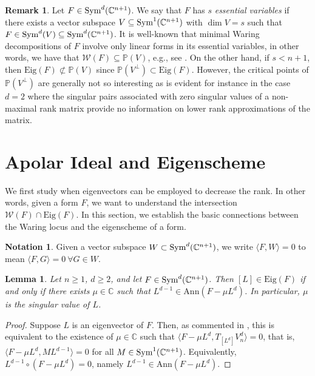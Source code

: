 \documentclass{amsart}
\numberwithin{theorem}{section}
\newtheorem{lemma}[theorem]{Lemma}
\theoremstyle{definition}
\newtheorem{remark}[theorem]{Remark}
\newtheorem{notation}[theorem]{Notation}
\newcommand{\Eig}{\mathrm{Eig}}
\newcommand{\W}{\mathcal{W}}
\newcommand{\PP}{\mathbb{P}}
\newcommand{\CC}{\mathbb{C}}
\newcommand{\sym}{\mathop{\rm Sym}\nolimits}
\begin{document}
\begin{remark}    
Let $F\in \sym^d(\CC^{n+1})$. We say that $F$ has $s$ \emph{essential variables} if there exists a vector subspace $V\subseteq \sym^1(\CC^{n+1})$ with $\dim V=s$ such that $F\in \sym^d(V)\subseteq \sym^d (\CC^{n+1})$. It is well-known that minimal Waring decompositions of $F$ involve only linear forms in its essential variables, in other words, we have that $\W(F)\subseteq \PP(V)$, e.g., see \cite[Remark 2.4]{carlini2017waring}. On the other hand, if $s<n+1$, then $\Eig(F)\not\subset \PP(V)$ since $\PP(V^\perp)\subset \Eig(F)$. 
However, the critical points of $\PP(V^\perp)$ are generally not so interesting as is evident for instance in the case $d=2$ where the singular pairs associated with zero singular values 
of a non-maximal rank matrix provide no information on lower rank approximations of the matrix. 
\end{remark}



\section{Apolar Ideal and Eigenscheme}\label{section: apolarity vs eigenscheme}
We first study when eigenvectors can be employed to decrease the rank. In other words, given a form $F$, we want to understand the intersection $\W(F) \cap \Eig(F)$. In this section, we establish the basic connections between the Waring locus and the eigenscheme of a form. 

\begin{notation}
 Given a vector subspace $W\subset \sym^d(\CC^{n+1})$, we write $\langle F,W \rangle=0$ to mean $\langle F,G\rangle=0 ~\forall G\in W$.
\end{notation}

\begin{lemma}\label{lemma:apolar vs eig}
Let $n\geq 1$, $d\geq 2$, and let $F\in \sym^d(\CC^{n+1})$. Then
 $[L]\in \Eig(F)$ if and only if there exists $\mu \in \CC$ such that $L^{d-1}\in \mathrm{Ann}(F-\mu L^d)$. In particular, $\mu$ is the singular value of $L$. 

\end{lemma}
\begin{proof}
Suppose $L$ is an eigenvector of $F$. Then, as commented in , this is equivalent to the existence of $\mu\in \CC$ such that $\langle F-\mu L^d,T_{[L^d]}V_n^d\rangle=0$, that is, $\langle F-\mu L^d,ML^{d-1}\rangle=0$ for all $M\in \sym^1(\CC^{n+1})$. Equivalently, $L^{d-1}\circ (F-\mu L^d)=0$, namely
$L^{d-1}\in \mathrm{Ann}(F-\mu L^d)$.
\end{proof}
\end{document}
